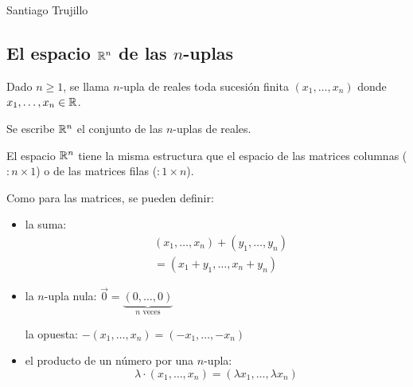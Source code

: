 \documentclass[11pt,a4paper]{article}
\begin{document}
\maketitle
\vspace{-1.6em}
\begin{center}
  {\normalsize Santiago Trujillo\par}
\end{center}
\vspace{0.5em}
\tableofcontents



\subsection{\texorpdfstring{El espacio $\mathbb{R}^n$ de las $n$-uplas}{El espacio Rn de las n-uplas}}

\begin{definicion}
Dado $n\geq1$, se llama $n$-upla de reales toda sucesión finita $(x_1,\dots,x_n)$ donde $x_1,\dots,x_n\in\mathbb{R}$.

Se escribe $\mathbb{R}^n$ el conjunto de las $n$-uplas de reales.
\end{definicion}

El espacio $\mathbb{R}^n$ tiene la misma estructura que el espacio de las matrices columnas ($:n\times1$) o de las matrices filas ($:1\times n$).

Como para las matrices, se pueden definir:
\begin{itemize}
  \item la suma:
  \begin{align*}
  &(x_1,\dots,x_n)+(y_1,\dots,y_n)\\
  &=(x_1+y_1,\dots,x_n+y_n)
  \end{align*}
  \item la $n$-upla nula: $\vec0=\underbrace{(0,\dots,0)}_{n\text{ veces}}$

  la opuesta: $-(x_1,\dots,x_n)=(-x_1,\dots,-x_n)$
  \item el producto de un número por una $n$-upla:
  \[
  \lambda\cdot(x_1,\dots,x_n)=(\lambda x_1,\dots,\lambda x_n)
  \]
\end{itemize}
\end{document}

